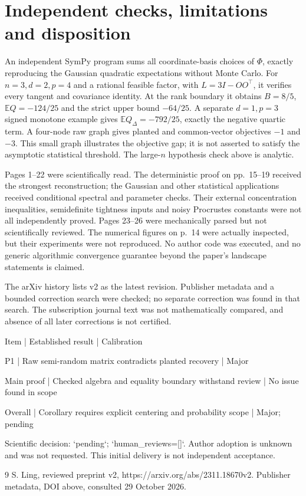 \documentclass[10pt]{article}
\begin{document}
\section*{Independent checks, limitations and disposition}
An independent SymPy program sums all coordinate-basis choices of \(\Phi\), exactly reproducing the Gaussian quadratic expectations without Monte Carlo. For \(n=3,d=2,p=4\) and a rational feasible factor, with \(L=3I-OO^\top\), it verifies every tangent and covariance identity. At the rank boundary it obtains \(B=8/5\), \(\mathbb E Q=-124/25\) and the strict upper bound \(-64/25\). A separate \(d=1,p=3\) signed monotone example gives \(\mathbb E Q_\Delta=-792/25\), exactly the negative quartic term. A four-node raw graph gives planted and common-vector objectives \(-1\) and \(-3\). This small graph illustrates the objective gap; it is not asserted to satisfy the asymptotic statistical threshold. The large-\(n\) hypothesis check above is analytic.\par
Pages 1–22 were scientifically read. The deterministic proof on pp. 15–19 received the strongest reconstruction; the Gaussian and other statistical applications received conditional spectral and parameter checks. Their external concentration inequalities, semidefinite tightness inputs and noisy Procrustes constants were not all independently proved. Pages 23–26 were mechanically parsed but not scientifically reviewed. The numerical figures on p. 14 were actually inspected, but their experiments were not reproduced. No author code was executed, and no generic algorithmic convergence guarantee beyond the paper’s landscape statements is claimed.\par
The arXiv history lists v2 as the latest revision. Publisher metadata and a bounded correction search were checked; no separate correction was found in that search. The subscription journal text was not mathematically compared, and absence of all later corrections is not certified.\par
Item | Established result | Calibration\par
P1 | Raw semi-random matrix contradicts planted recovery | Major\par
Main proof | Checked algebra and equality boundary withstand review | No issue found in scope\par
Overall | Corollary requires explicit centering and probability scope | Major; pending\par
Scientific decision: `pending`; `human\_reviews=[]`. Author adoption is unknown and was not requested. This initial delivery is not independent acceptance.\par
9 S. Ling, reviewed preprint v2, https://arxiv.org/abs/2311.18670v2. Publisher metadata, DOI above, consulted 29 October 2026.\par
\end{document}
